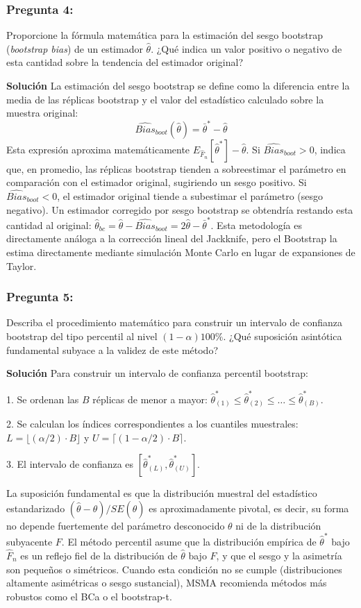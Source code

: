 \documentclass[a4paper]{article}
\begin{document}
\subsubsection{Pregunta 4:} Proporcione la fórmula matemática para la estimación del sesgo bootstrap (\textit{bootstrap bias}) de un estimador $\hat{\theta}$. ¿Qué indica un valor positivo o negativo de esta cantidad sobre la tendencia del estimador original?

\textbf{Solución}
La estimación del sesgo bootstrap se define como la diferencia entre la media de las réplicas bootstrap y el valor del estadístico calculado sobre la muestra original:
$$ \widehat{Bias}_{boot}(\hat{\theta}) = \bar{\theta}^* - \hat{\theta} $$
Esta expresión aproxima matemáticamente $E_{\hat{F}_n}[\hat{\theta}^*] - \hat{\theta}$. Si $\widehat{Bias}_{boot} > 0$, indica que, en promedio, las réplicas bootstrap tienden a sobreestimar el parámetro en comparación con el estimador original, sugiriendo un sesgo positivo. Si $\widehat{Bias}_{boot} < 0$, el estimador original tiende a subestimar el parámetro (sesgo negativo). Un estimador corregido por sesgo bootstrap se obtendría restando esta cantidad al original: $\hat{\theta}_{bc} = \hat{\theta} - \widehat{Bias}_{boot} = 2\hat{\theta} - \bar{\theta}^*$. Esta metodología es directamente análoga a la corrección lineal del Jackknife, pero el Bootstrap la estima directamente mediante simulación Monte Carlo en lugar de expansiones de Taylor.

\subsubsection{Pregunta 5:} Describa el procedimiento matemático para construir un intervalo de confianza bootstrap del tipo percentil al nivel $(1-\alpha)100\%$. ¿Qué suposición asintótica fundamental subyace a la validez de este método?

\textbf{Solución}
Para construir un intervalo de confianza percentil bootstrap:

1. Se ordenan las $B$ réplicas de menor a mayor: $\hat{\theta}^*_{(1)} \leq \hat{\theta}^*_{(2)} \leq \dots \leq \hat{\theta}^*_{(B)}$.

2. Se calculan los índices correspondientes a los cuantiles muestrales: $L = \lfloor (\alpha/2) \cdot B \rfloor$ y $U = \lceil (1-\alpha/2) \cdot B \rceil$.

3. El intervalo de confianza es $[\hat{\theta}^*_{(L)}, \hat{\theta}^*_{(U)}]$.

La suposición fundamental es que la distribución muestral del estadístico estandarizado $(\hat{\theta} - \theta)/SE(\hat{\theta})$ es aproximadamente pivotal, es decir, su forma no depende fuertemente del parámetro desconocido $\theta$ ni de la distribución subyacente $F$. El método percentil asume que la distribución empírica de $\hat{\theta}^*$ bajo $\hat{F}_n$ es un reflejo fiel de la distribución de $\hat{\theta}$ bajo $F$, y que el sesgo y la asimetría son pequeños o simétricos. Cuando esta condición no se cumple (distribuciones altamente asimétricas o sesgo sustancial), MSMA recomienda métodos más robustos como el BCa o el bootstrap-t.
\end{document}

